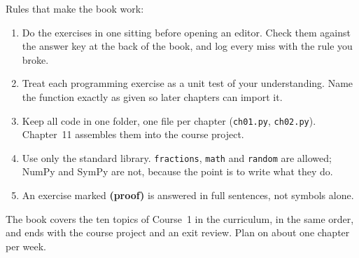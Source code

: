 \documentclass[11pt,letterpaper,openany]{book}
\begin{document}
Rules that make the book work:

\begin{enumerate}
\item Do the exercises in one sitting before opening an editor. Check them against the answer key at the back of the book, and log every miss with the rule you broke.
\item Treat each programming exercise as a unit test of your understanding. Name the function exactly as given so later chapters can import it.
\item Keep all code in one folder, one file per chapter (\lstinline!ch01.py!, \lstinline!ch02.py!). Chapter~11 assembles them into the course project.
\item Use only the standard library. \lstinline!fractions!, \lstinline!math! and \lstinline!random! are allowed; NumPy and SymPy are not, because the point is to write what they do.
\item An exercise marked \textbf{(proof)} is answered in full sentences, not symbols alone.
\end{enumerate}

The book covers the ten topics of Course~1 in the curriculum, in the same order, and ends with the course project and an exit review. Plan on about one chapter per week.

\cleardoublepage
\tableofcontents

\mainmatter
\pagestyle{body}













\backmatter
\pagestyle{body}


\end{document}
